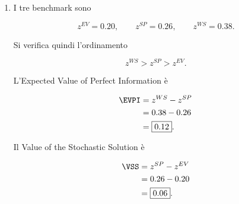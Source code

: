 \begin{enumerate}
e quindi

\[
Q_1(x^{EV})=0.
\]

Nel secondo scenario il problema di ricorso \`e

\[
Q_2(x^{EV})
=
\max_{\substack{g_2\geq0\\0\leq u_2\leq3}}
\left\{
-0.20u_2:
5+u_2-g_2=8
\right\}.
\]

Il vincolo di bilancio implica $u_2-g_2=3$, ossia $u_2=3+g_2$.
Poich\'e $g_2\geq0$
e $u_2\leq3$, l'unica soluzione ammissibile \`e

\[
\boxed{
u_2^*=3,
\qquad
g_2^*=0.
}
\]

Il valore del ricorso nello scenario $2$ \`e quindi

\[
Q_2(x^{EV})
=
-0.20(3)
=
-0.60.
\]

Il valore stocastico della decisione
$x^{EV}$ \`e infine

\[
\begin{aligned}
z^{EV}
&=
c'x^{EV}
+
\frac12 Q_1(x^{EV})
+
\frac12 Q_2(x^{EV})
\\
&=
0.50
+
\frac12(0)
+
\frac12(-0.60)
\\
&=
\boxed{0.20}.
\end{aligned}
\]

La distinzione \`e quindi

\[
\Pi^{EV}(10)=0.39
\]

per il valore ottimo del problema deterministico medio,
mentre

\[
z^{EV}=0.20
\]

\`e il valore della decisione iniziale $x^{EV}$
quando essa viene valutata
negli scenari originari.

\item I tre benchmark sono

\[
\boxed{
z^{EV}=0.20,
\qquad
z^{SP}=0.26,
\qquad
z^{WS}=0.38.
}
\]

Si verifica quindi l'ordinamento

\[
z^{WS}>z^{SP}>z^{EV}.
\]

L'Expected Value of Perfect Information \`e

\[
\begin{aligned}
\EVPI
&=
z^{WS}-z^{SP}
\\
&=
0.38-0.26
\\
&=
\boxed{0.12}.
\end{aligned}
\]

Il Value of the Stochastic Solution \`e

\[
\begin{aligned}
\VSS
&=
z^{SP}-z^{EV}
\\
&=
0.26-0.20
\\
&=
\boxed{0.06}.
\end{aligned}
\]


\end{enumerate}
